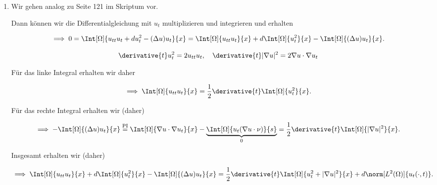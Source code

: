 \begin{solution}

\phantom{}

\begin{enumerate}[label = (\roman*)]

    \item Wir gehen analog zu Seite 121 im Skriptum vor.
    
    Dann können wir die Differentialgleichung mit $u_t$ multiplizieren und integrieren und erhalten

    \begin{align*}
        \implies
        0
        =
        \Int[\Omega]{u_{tt} u_t + d u_t^2 - (\Delta u) u_t}{x}
        =
        \Int[\Omega]{u_{tt} u_t}{x}
        +
        d \Int[\Omega]{u_t^2}{x}
        -
        \Int[\Omega]{(\Delta u) u_t}{x}.
    \end{align*}

    \begin{align*}
        \derivative{t} u_t^2 = 2 u_{tt} u_t,
        \quad
        \derivative{t} |\nabla u|^2 = 2 \nabla u \cdot \nabla u_t
    \end{align*}

    Für das linke Integral erhalten wir daher

    \begin{align*}
        \implies
        \Int[\Omega]{u_{tt} u_t}{x}
        =
        \frac{1}{2}
        \derivative{t}
        \Int[\Omega]{u_t^2}{x}.        
    \end{align*}

    Für das rechte Integral erhalten wir (daher)

    \begin{align*}
        \implies
        -\Int[\Omega]{(\Delta u) u_t}{x}
        \stackrel
        {
            \mathrm{PI}
        }{=}
        \Int[\Omega]{\nabla u \cdot \nabla u_t}{x}
        -
        \underbrace
        {
            \Int[\Omega]{u_t (\nabla u \cdot \nu)}{s}
        }_0
        =
        \frac{1}{2}
        \derivative{t}
        \Int[\Omega]{|\nabla u|^2}{x}.
    \end{align*}

    Insgesamt erhalten wir (daher)

    \begin{align*}
        \implies
        \Int[\Omega]{u_{tt} u_t}{x}
        +
        d \Int[\Omega]{u_t^2}{x}
        -
        \Int[\Omega]{(\Delta u) u_t}{x}
        =
        \frac{1}{2}
        \derivative{t}
        \Int[\Omega]{u_t^2 + |\nabla u|^2}{x}
        +
        d \norm[L^2(\Omega)]{u_t(\cdot, t)}.
    \end{align*}


\end{enumerate}
\end{solution}
